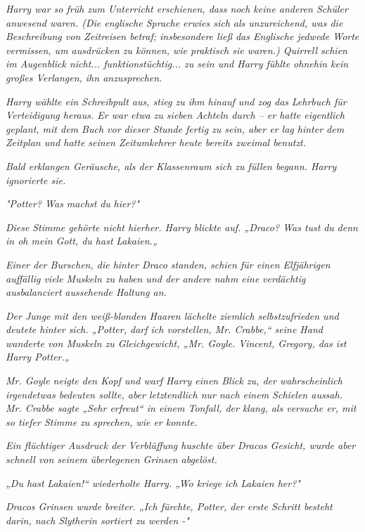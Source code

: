 {\emph{Harry war so früh zum Unterricht erschienen, dass noch keine anderen Schüler anwesend waren. (Die englische Sprache erwies sich als unzureichend, was die Beschreibung von Zeitreisen betraf; insbesondere ließ das Englische jedwede Worte vermissen, um ausdrücken zu können, wie praktisch sie waren.) Quirrell schien im Augenblick nicht... funktionstüchtig... zu sein und Harry fühlte ohnehin kein großes Verlangen, ihn anzusprechen.}

\emph{Harry wählte ein Schreibpult aus, stieg zu ihm hinauf und zog das} \emph{Lehrbuch für Verteidigung heraus. Er war etwa zu sieben Achteln durch -- er hatte eigentlich geplant, mit dem Buch vor dieser Stunde fertig zu sein, aber er lag hinter dem Zeitplan und hatte seinen Zeitumkehrer heute bereits zweimal benutzt.}

\emph{Bald erklangen Geräusche, als der Klassenraum sich zu füllen begann. Harry ignorierte sie.}

\emph{"Potter? Was machst} \emph{\emph{du}} \emph{hier?"}

\emph{\emph{Diese}} \emph{Stimme gehörte nicht hierher. Harry blickte auf. „Draco? Was tust} \emph{\emph{du}} \emph{denn in oh mein Gott, du hast} \emph{\emph{Lakaien.}„}

\emph{Einer der Burschen, die hinter Draco standen, schien für einen Elfjährigen auffällig viele Muskeln zu haben und der andere nahm eine} \emph{verdächtig ausbalanciert} \emph{aussehende Haltung an.}

\emph{Der Junge mit den weiß-blonden Haaren lächelte ziemlich selbstzufrieden und deutete hinter sich. „Potter, darf ich vorstellen, Mr. Crabbe,“ seine Hand wanderte von Muskeln zu Gleichgewicht, „Mr. Goyle. Vincent, Gregory, das ist Harry Potter.„}

\emph{Mr. Goyle neigte den Kopf und warf Harry einen Blick zu, der wahrscheinlich irgendetwas bedeuten sollte, aber letztendlich nur nach einem Schielen aussah. Mr. Crabbe sagte „Sehr erfreut“ in einem Tonfall, der klang, als versuche er, mit so tiefer Stimme zu sprechen, wie er konnte.}

\emph{Ein flüchtiger Ausdruck der Verblüffung huschte über Dracos Gesicht, wurde aber schnell von seinem überlegenen Grinsen abgelöst.}

\emph{„Du hast} \emph{\emph{Lakaien!}“ wiederholte Harry. „Wo kriege} \emph{\emph{ich}} \emph{Lakaien her?"}

\emph{Dracos Grinsen wurde breiter. „Ich fürchte, Potter, der erste Schritt besteht darin, nach Slytherin sortiert zu werden -"}

}
